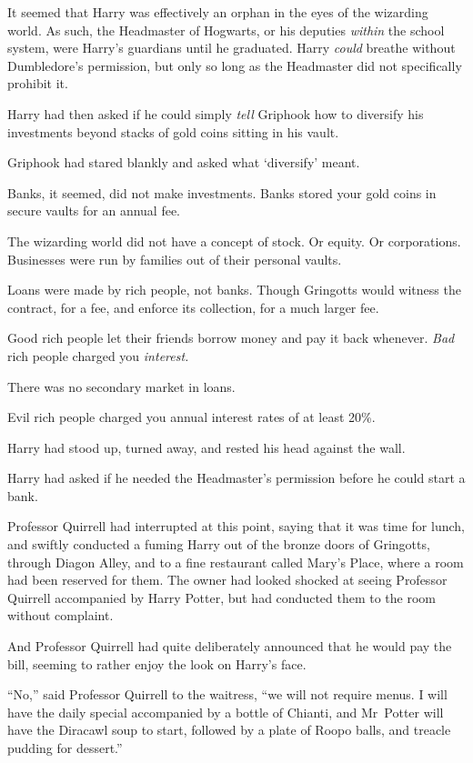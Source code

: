 It seemed that Harry was effectively an orphan in the eyes of the wizarding world. As such, the Headmaster of Hogwarts, or his deputies \emph{within} the school system, were Harry’s guardians until he graduated. Harry \emph{could} breathe without Dumbledore’s permission, but only so long as the Headmaster did not specifically prohibit it.

Harry had then asked if he could simply \emph{tell} Griphook how to diversify his investments beyond stacks of gold coins sitting in his vault.

Griphook had stared blankly and asked what ‘diversify’ meant.

Banks, it seemed, did not make investments. Banks stored your gold coins in secure vaults for an annual fee.

The wizarding world did not have a concept of stock. Or equity. Or corporations. Businesses were run by families out of their personal vaults.

Loans were made by rich people, not banks. Though Gringotts would witness the contract, for a fee, and enforce its collection, for a much larger fee.

Good rich people let their friends borrow money and pay it back whenever. \emph{Bad} rich people charged you \emph{interest.}

There was no secondary market in loans.

Evil rich people charged you annual interest rates of at least 20\%.

Harry had stood up, turned away, and rested his head against the wall.

Harry had asked if he needed the Headmaster’s permission before he could start a bank.

Professor Quirrell had interrupted at this point, saying that it was time for lunch, and swiftly conducted a fuming Harry out of the bronze doors of Gringotts, through Diagon Alley, and to a fine restaurant called Mary’s Place, where a room had been reserved for them. The owner had looked shocked at seeing Professor Quirrell accompanied by Harry Potter, but had conducted them to the room without complaint.

And Professor Quirrell had quite deliberately announced that he would pay the bill, seeming to rather enjoy the look on Harry’s face.

“No,” said Professor Quirrell to the waitress, “we will not require menus. I will have the daily special accompanied by a bottle of Chianti, and Mr~Potter will have the Diracawl soup to start, followed by a plate of Roopo balls, and treacle pudding for dessert.”

